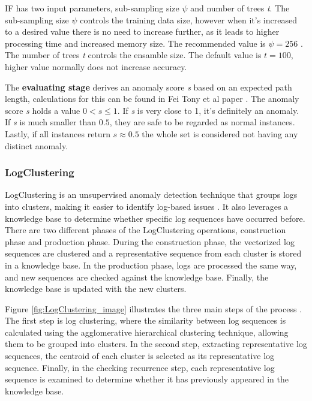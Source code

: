 IF has two input parameters, sub-sampling size \( \psi \) and number of trees \textit{t}. The sub-sampling size \( \psi \) controls the training data size, however when it's increased to a desired value there is no need to increase further, as it leads to higher processing time and increased memory size. The recommended value is \( \psi = 256 \) \cite{Fei2008IsolationForest}. The number of trees \textit{t} controls the ensamble size. The default value is  \( \textit{t} = 100 \), higher value normally does not increase accuracy. 

The \textbf{evaluating stage} derives an anomaly score \textit{s} based on an expected path length, calculations for this can be found in Fei Tony et al paper \cite{Fei2008IsolationForest}. The anomaly score \textit{s} holds a value $0 < s \leq 1$. If  \textit{s} is very close to 1, it's definitely an anomaly. If  \textit{s}  is much smaller than $0.5$, they are safe to be regarded as normal instances. Lastly, if all instances return $s\approx 0.5$ the whole set is considered not having any distinct anomaly. 

\subsubsection{LogClustering}
LogClustering is an unsupervised anomaly detection technique that groups logs into clusters, making it easier to identify log-based issues \cite{7883294}. It also leverages a knowledge base to determine whether specific log sequences have occurred before. There are two different phases of the LogClustering operations, construction phase and production phase. During the construction phase, the vectorized log sequences are clustered and a representative sequence from each cluster is stored in a knowledge base. In the production phase, logs are processed the same way, and new sequences are checked against the knowledge base. Finally, the knowledge base is updated with the new clusters. 

Figure \ref{fig:LogClustering_image} illustrates the three main steps of the process \cite{7883294}. The first step is log clustering, where the similarity between log sequences is calculated using the agglomerative hierarchical clustering technique, allowing them to be grouped into clusters. In the second step, extracting representative log sequences, the centroid of each cluster is selected as its representative log sequence. Finally, in the checking recurrence step, each representative log sequence is examined to determine whether it has previously appeared in the knowledge base. 

